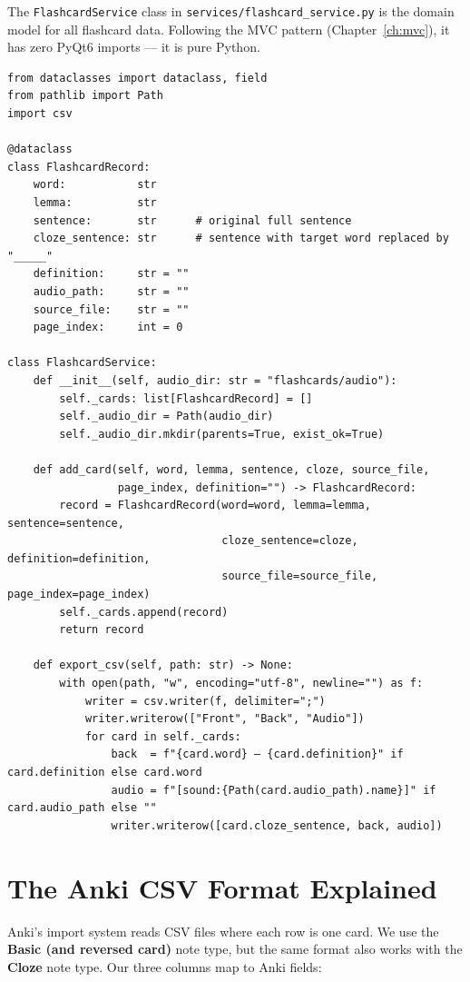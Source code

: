 \documentclass[12pt,oneside]{book}
\begin{document}
The \texttt{FlashcardService} class in \texttt{services/flashcard\_service.py} is the
domain model for all flashcard data. Following the MVC pattern (Chapter~\ref{ch:mvc}),
it has zero PyQt6 imports — it is pure Python.

\begin{lstlisting}[caption={FlashcardRecord and FlashcardService skeleton (LLR-24, LLR-26)}]
from dataclasses import dataclass, field
from pathlib import Path
import csv

@dataclass
class FlashcardRecord:
    word:           str
    lemma:          str
    sentence:       str      # original full sentence
    cloze_sentence: str      # sentence with target word replaced by "_____"
    definition:     str = ""
    audio_path:     str = ""
    source_file:    str = ""
    page_index:     int = 0

class FlashcardService:
    def __init__(self, audio_dir: str = "flashcards/audio"):
        self._cards: list[FlashcardRecord] = []
        self._audio_dir = Path(audio_dir)
        self._audio_dir.mkdir(parents=True, exist_ok=True)

    def add_card(self, word, lemma, sentence, cloze, source_file,
                 page_index, definition="") -> FlashcardRecord:
        record = FlashcardRecord(word=word, lemma=lemma, sentence=sentence,
                                 cloze_sentence=cloze, definition=definition,
                                 source_file=source_file, page_index=page_index)
        self._cards.append(record)
        return record

    def export_csv(self, path: str) -> None:
        with open(path, "w", encoding="utf-8", newline="") as f:
            writer = csv.writer(f, delimiter=";")
            writer.writerow(["Front", "Back", "Audio"])
            for card in self._cards:
                back  = f"{card.word} — {card.definition}" if card.definition else card.word
                audio = f"[sound:{Path(card.audio_path).name}]" if card.audio_path else ""
                writer.writerow([card.cloze_sentence, back, audio])
\end{lstlisting}

\section{The Anki CSV Format Explained}

Anki's import system reads CSV files where each row is one card. We use the
\textbf{Basic (and reversed card)} note type, but the same format also works with
the \textbf{Cloze} note type. Our three columns map to Anki fields:
\end{document}

